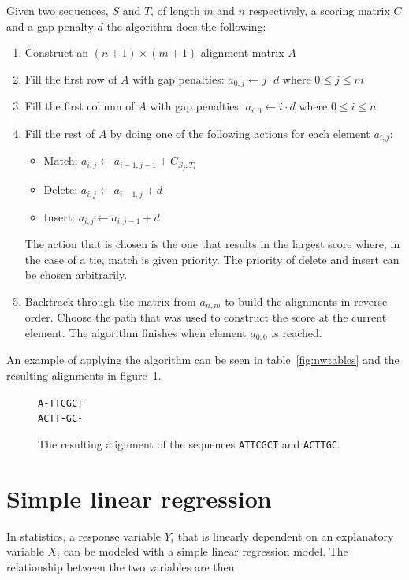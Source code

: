 \documentclass[a4paper]{report}
\begin{document}
Given two sequences, $S$ and $T$, of length $m$ and $n$ respectively, a scoring
matrix $C$ and a gap penalty $d$ the algorithm does the following:

\begin{enumerate}
    \item Construct an $(n + 1) \times (m + 1)$ alignment matrix $A$
    \item Fill the first row of $A$ with gap penalties: $a_{0,j} \gets j \cdot
        d$ where $0 \le j \le m$
    \item Fill the first column of $A$ with gap penalties: $a_{i,0} \gets i
        \cdot d$ where $0 \le i \le n$
    \item Fill the rest of $A$ by doing one of the following actions for each
        element $a_{i,j}$:
        \begin{itemize}
            \item Match: $a_{i,j} \gets a_{i - 1, j - 1} + C_{S_j,T_i}$
            \item Delete: $a_{i,j} \gets a_{i - 1, j} + d$
            \item Insert: $a_{i,j} \gets a_{i, j - 1} + d$
        \end{itemize}
        The action that is chosen is the one that results in the largest score
        where, in the case of a tie, match is given priority. The priority of
        delete and insert can be chosen arbitrarily.
    \item Backtrack through the matrix from $a_{n,m}$ to build the alignments
        in reverse order. Choose the path that was used to construct the score
        at the current element. The algorithm finishes when element $a_{0,0}$
        is reached.
\end{enumerate}

An example of applying the algorithm can be seen in table~\ref{fig:nwtables}
and the resulting alignments in figure~\ref{fig:align}.

\begin{figure}[h]
    \centering
    \texttt{A-TTCGCT\\ACTT-GC-}
    \captionsetup{width=0.8\textwidth}
    \caption{The resulting alignment of the sequences \texttt{ATTCGCT} and
    \texttt{ACTTGC}.}
    \label{fig:align}
\end{figure}

\section{Simple linear regression}
In statistics, a response variable $Y_i$ that is linearly dependent on an
explanatory variable $X_i$ can be modeled with a simple linear regression
model. The relationship between the two variables are then
\end{document}
